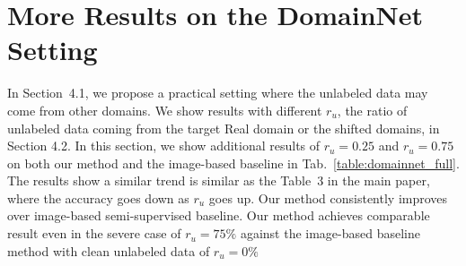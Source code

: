 \documentclass[runningheads]{llncs}
\begin{document}
\begin{table*}[h]
\centering
\renewcommand{\arraystretch}{1.2}
\caption{
Sensitivity analysis for $I_p$.
Numbers represent error rates in three runs.
}
\label{table:ip}
\end{table*}


\section{More Results on the DomainNet Setting}
In Section~4.1, we propose a practical setting where the unlabeled data may come from other domains. 
We show results with different $r_u$, the ratio of unlabeled data coming from the target Real domain or the shifted domains, in Section 4.2.
In this section, we show additional results of $r_u = 0.25$ and $r_u = 0.75$ on both our method and the image-based baseline in Tab.~\ref{table:domainnet_full}.
The results show a similar trend is similar as the Table~3 in the main paper, where the accuracy goes down as $r_u$ goes up.
Our method consistently improves over image-based semi-supervised baseline.
Our method achieves comparable result even in the severe case of $r_u=75\%$ against the image-based baseline method with clean unlabeled data of $r_u=0\%$

\begin{table*}[h]
\centering
\renewcommand{\arraystretch}{1.2}
\caption{
Comparison between the image-based baseline with our proposed feature-based augmentation method on DomainNet with various $r_u$, the ratio of unlabeled data coming from the shifted domains. For instance, $r_u=25 \%$ means 25\% of the unlabeled data are coming from the shifted domains and 75\% are coming from the domain same as the labeled set.
Numbers are error rates across 3 runs, meaning the lower the better.
}
\label{table:domainnet_full}
\end{table*}
\end{document}
